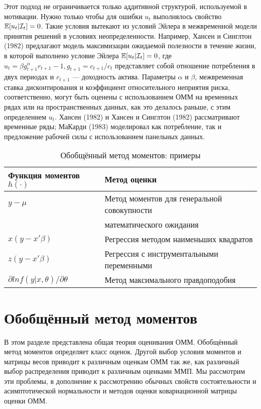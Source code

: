 Этот подход не ограничивается только аддитивной структурой, используемой в мотивации. Нужно только чтобы для ошибки $u_t$ выполнялось свойство $\mathbb{E}[u_t|\mathcal{I}_{t}]=0$. Такие условия
вытекают из условий Эйлера в межвременной модели принятия решений в условиях неопределенности. Например, Хансен и Синглтон (1982) предлагают модель максимизации ожидаемой полезности в течение жизни, в которой выполнено условие Эйлера $\mathbb{E}[u_t|\mathcal{I}_{t}]=0$, где $u_t=\beta g^{\alpha}_{t+1} r_{t+1}-1,g_{t+1}=c_{t+1}/c_t$ представляет собой отношение потребления в двух периодах и $r_{t+1}$ --- доходность актива.
Параметры $\alpha$ и $\beta$, межвременная ставка дисконтирования и коэффициент относительного неприятия риска, соответственно, могут быть оценены с использованием ОММ на временных рядах или на пространственных данных, как это делалось раньше, с этим определением $u_t$. Хансен (1982) и Хансен и Синглтон (1982) рассматривают временные ряды; МаКарди (1983) моделировал как потребление, так и предложение рабочей силы с использованием панельных данных.

\begin{table}[h]
\begin{center}
\caption{\label{tab:GMM} Обобщённый метод моментов: примеры}
\begin{tabular}[t]{ll}
\hline
\hline
\bf{Функция моментов $h(\cdot)$} & \bf{Метод оценки} \\
\hline
$y-\mu$ & Метод моментов для  генеральной совокупности \\
& математического ожидания \\
$x(y-x'\beta)$ & Регрессия методом наименьших квадратов \\
$z(y-x'\beta)$ & Регрессия с инструментальными переменными \\
$\partial ln f(y|x,\theta) / \partial \theta$ & Метод максимального правдоподобия \\
\hline
\hline
\end{tabular}
\end{center}
\end{table}

\section{Обобщённый метод моментов}

В этом разделе представлена общая теория оценивания ОММ. Обобщённый метод моментов определяет класс оценок. Другой выбор условия моментов и матрицы весов приводит к различным оценкам ОММ так же, как различный выбор распределения приводит к различным оценками ММП. Мы рассмотрим эти проблемы, в дополнение к рассмотрению обычных свойств состоятельности и асимптотической нормальности и методов оценки ковариационной матрицы оценки ОММ.

